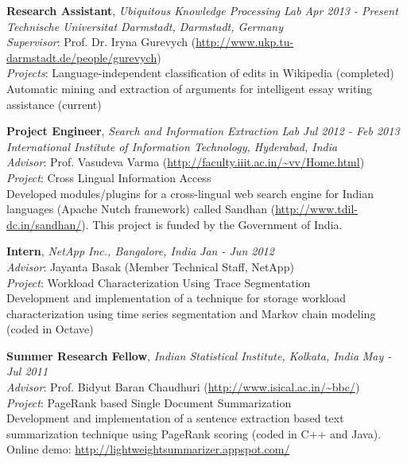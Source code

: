 \documentclass[9pt]{article}
\newenvironment{changemargin}[2]{%
  \begin{list}{}{%
    \setlength{\topsep}{0pt}%
    \setlength{\leftmargin}{#1}%
    \setlength{\rightmargin}{#2}%
    \setlength{\listparindent}{\parindent}%
    \setlength{\itemindent}{\parindent}%
    \setlength{\parsep}{\parskip}%
  }%
  \item[]}{\end{list}
}
\newenvironment{body} {
	\vspace*{-16pt}
	\begin{changemargin}{-0.25in}{-0.5in}
  }	
	{\end{changemargin}
}
\begin{document}
\begin{body}
	\vspace{14pt}
	\textbf{Research Assistant}, \emph{Ubiquitous Knowledge Processing Lab} \hfill \emph{Apr 2013 - Present} \\
	\emph{Technische Universitat Darmstadt, Darmstadt, Germany} \\
	\emph{Supervisor}: Prof. Dr. Iryna Gurevych (\url{http://www.ukp.tu-darmstadt.de/people/gurevych}) \\
	\emph{Projects}: Language-independent classification of edits in Wikipedia (completed) \\ 
	\hspace{40pt} Automatic mining and extraction of arguments for intelligent essay writing assistance (current)\\
	
	\medskip
	
	\textbf {Project Engineer}, \emph{Search and Information Extraction Lab} \hfill \emph{Jul 2012 - Feb 2013} \\
	\emph{International Institute of Information Technology, Hyderabad, India} \\
	\emph{Advisor}: Prof. Vasudeva Varma (\url{http://faculty.iiit.ac.in/~vv/Home.html}) \\
	\emph{Project}: Cross Lingual Information Access \\
	Developed modules/plugins for a cross-lingual web search engine for Indian languages (Apache Nutch framework) called Sandhan (\url{http://www.tdil-dc.in/sandhan/}). 
	This project is funded by the Government of India.
	
	\medskip
	
	\textbf {Intern}, \emph{NetApp Inc., Bangalore, India} \hfill \emph{Jan - Jun 2012} \\
	\emph{Advisor}: Jayanta Basak (Member Technical Staff, NetApp) \\
	\emph{Project}: Workload Characterization Using Trace Segmentation \\
	Development and implementation of a technique for storage workload characterization using time series segmentation and Markov chain modeling (coded in Octave) \\
	
	\medskip
	
	\textbf {Summer Research Fellow}, \emph{Indian Statistical Institute, Kolkata, India} \hfill \emph{May - Jul 2011} \\
	\emph{Advisor}: Prof. Bidyut Baran Chaudhuri (\url{http://www.isical.ac.in/~bbc/}) \\
	\emph{Project}: PageRank based Single Document Summarization \\
	Development and implementation of a sentence extraction based text summarization technique using PageRank scoring (coded in C++ and Java). Online demo: \url{http://lightweightsummarizer.appspot.com/}

\end{body}
\end{document}
